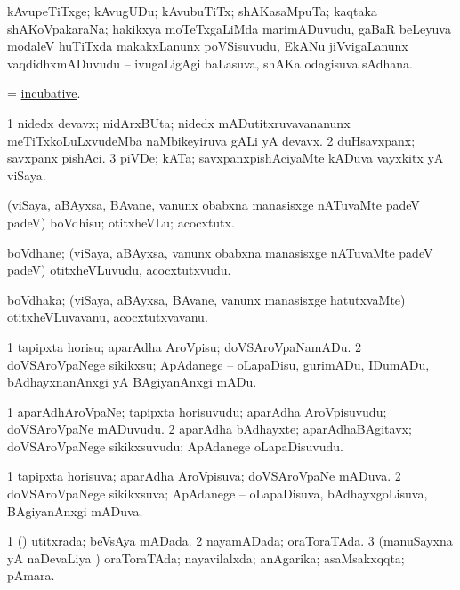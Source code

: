 \bentry
{}
\gl{\nA}
\bmng
kAvupeTiTxge; kAvugUDu; kAvubuTiTx; shAKasaMpuTa; kaqtaka shAKoVpakaraNa; hakikxya moTeTxgaLiMda marimADuvudu, gaBaR beLeyuva modaleV huTiTxda makakxLanunx poVSisuvudu, EkANu jiVvigaLanunx vaqdidhxmADuvudu -- ivugaLigAgi baLasuva, shAKa odagisuva sAdhana. 
\emng
\eentry

\bentry
{}
\gl{\gu}
\bmng
 = \hyperlink{incubative}{incubative}. 
\emng
\eentry

\bentry
{}
\gl{\nA}
\bmng
\bnum
\num{1} nidedx devavx; nidArxBUta; nidedx mADutitxruvavananunx meTiTxkoLuLxvudeMba naMbikeyiruva gALi yA devavx. 
\num{2} duHsavxpanx; savxpanx pishAci. 
\num{3} piVDe; kATa; savxpanxpishAciyaMte kADuva vayxkitx yA viSaya. 
\enum
\emng
\eentry

\bentry
{}
\gl{\sakirx}
\bmng
(viSaya, aBAyxsa, BAvane, \mo vanunx obabxna manasisxge nATuvaMte padeV padeV) boVdhisu; otitxheVLu; acocxtutx. 
\emng
\eentry

\bentry
{}
\gl{\nA}
\bmng
boVdhane; (viSaya, aBAyxsa, \mo vanunx obabxna manasisxge nATuvaMte padeV padeV) otitxheVLuvudu, acocxtutxvudu. 
\emng
\eentry

\bentry
{}
\gl{\nA}
\bmng
boVdhaka; (viSaya, aBAyxsa, BAvane, \mo vanunx manasisxge hatutxvaMte) otitxheVLuvavanu, acocxtutxvavanu. 
\emng
\eentry

\bentry
{}
\gl{\sakirx}
\bmng
\bnum
\num{1} tapipxta horisu; aparAdha AroVpisu; doVSAroVpaNamADu. 
\num{2} doVSAroVpaNege sikikxsu; ApAdanege -- oLapaDisu, gurimADu, IDumADu, bAdhayxnanAnxgi yA BAgiyanAnxgi mADu. 
\enum
\emng
\eentry

\bentry
{}
\gl{\nA}
\bmng
\bnum
\num{1} aparAdhAroVpaNe; tapipxta horisuvudu; aparAdha AroVpisuvudu; doVSAroVpaNe mADuvudu. 
\num{2} aparAdha bAdhayxte; aparAdhaBAgitavx; doVSAroVpaNege sikikxsuvudu; ApAdanege oLapaDisuvudu. 
\enum
\emng
\eentry

\bentry
{}
\gl{\gu}
\bmng
\bnum
\num{1} tapipxta horisuva; aparAdha AroVpisuva; doVSAroVpaNe mADuva. 
\num{2} doVSAroVpaNege sikikxsuva; ApAdanege -- oLapaDisuva, bAdhayxgoLisuva, BAgiyanAnxgi mADuva. 
\enum
\emng
\eentry

\bentry
{}
\gl{\gu}
\bmng
\bnum
\num{1} (\viparx) utitxrada; beVsAya mADada. 
\num{2} nayamADada; oraToraTAda. 
\num{3} (manuSayxna yA naDevaLiya \vi) oraToraTAda; nayavilalxda; anAgarika; asaMsakxqqta; pAmara. 
\enum
\emng
\eentry

